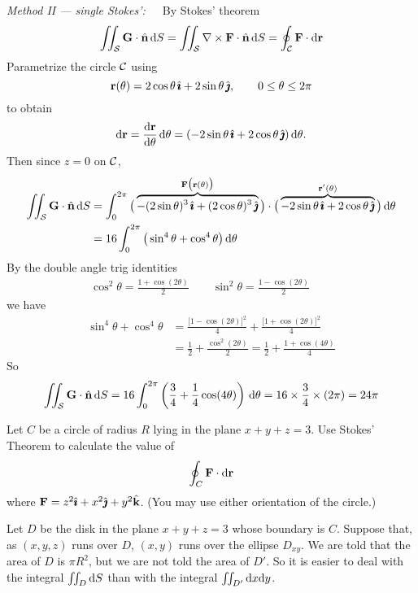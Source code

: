 \begin{solution}
\emph{Method II --- single Stokes':}\ \ \ 
By Stokes' theorem
\begin{equation*}
\iint_{\mathcal{S}} \mathbf{G}\cdot \hat{\mathbf{n}}\,\mathrm{d}S
= \iint_{\mathcal{S}} \nabla\times\mathbf{F}\cdot \hat{\mathbf{n}}\,\mathrm{d}S
= \oint_{\mathcal{C}} \mathbf{F}\cdot \mathrm{d}\mathbf{r}
\end{equation*}
Parametrize the circle $\mathcal{C}$ using
$$
\mathbf{r}(\theta) = 2\cos\theta\,\hat{\pmb{\imath}} + 2\sin\theta\,\hat{\pmb{\jmath}},\qquad 0\le\theta\le 2\pi
$$
to obtain
$$
\dee{\vr} = \diff{\vr}{\theta}\,\dee{\theta}
= (-2\sin\theta\,\hi + 2\cos\theta\,\hj)\,\dee{\theta}.
$$
Then since $z=0$ on $\mathcal{C}$,
\begin{align*}
\iint_{\mathcal{S}} \mathbf{G}\cdot \hat{\mathbf{n}}\,\mathrm{d}S
&= \int_{0}^{2\pi}\big(
\overbrace{-(2\sin\theta)^3\,\hat{\pmb{\imath}} + (2\cos\theta)^3\,\hat{\pmb{\jmath}}}^
                                          {\mathbf{F}\big(\mathbf{r}(\theta)\big)}\big)
\cdot \big(\overbrace{-2\sin\theta\,\hat{\pmb{\imath}} + 2\cos\theta\,\hat{\pmb{\jmath}}}^{\mathbf{r}'(\theta)}\big)
 \,\mathrm{d}\theta
\\
&= 16 \int_{0}^{2\pi}\big(\sin^4\theta + \cos^4\theta\big)\,\mathrm{d}\theta
\end{align*}
By the double angle trig identities
\begin{align*}
\cos^2\theta=\frac{1+\cos(2\theta)}{2}\qquad
\sin^2\theta=\frac{1-\cos(2\theta)}{2}\qquad
\end{align*}
we have
\begin{align*}
\sin^4\theta + \cos^4\theta
&=\frac{\big[1-\cos(2\theta)\big]^2}{4} 
 + \frac{\big[1+\cos(2\theta)\big]^2}{4} \\
&=\frac{1}{2} + \frac{\cos^2(2\theta)}{2}
=\frac{1}{2} + \frac{1+\cos(4\theta)}{4}
\end{align*}
So
$$
\iint_{\mathcal{S}} \mathbf{G}\cdot \hat{\mathbf{n}}\,\mathrm{d}S
=16\int_{0}^{2\pi} \left(\frac{3}{4}+\frac{1}{4}\cos(4\theta)\right)
                   \,\mathrm{d}\theta
= 16\times\frac{3}{4}\times (2\pi) = 24\pi
$$

\end{solution}

\begin{question}[M317 1999A] %
 Let $C$ be a circle of radius $R$ lying in the plane $x+y+z=3$.
Use Stokes' Theorem to calculate the value of 
$$
\oint_C \mathbf{F}\cdot \mathrm{d}\mathbf{r}
$$
where $\mathbf{F}=z^2\hat{\pmb{\imath}}+x^2\hat{\pmb{\jmath}}+y^2\hat{\mathbf{k}}$. (You may use either orientation of the
circle.)

\end{question}

\begin{hint} 
Let $D$ be the disk in the plane $x+y+z=3$ whose boundary is $C$.
Suppose that, as $(x,y,z)$ runs over $D$, $(x,y)$ runs over the
ellipse $D_{xy}$. 
We are told that the area of $D$ is $\pi R^2$, but we are
not told the area of $D'$. So it is easier to deal with the
integral $\iint_D \mathrm{d}S$ than with the integral 
$\iint_{D'}\mathrm{d}x\mathrm{d}y$.
\end{hint}

